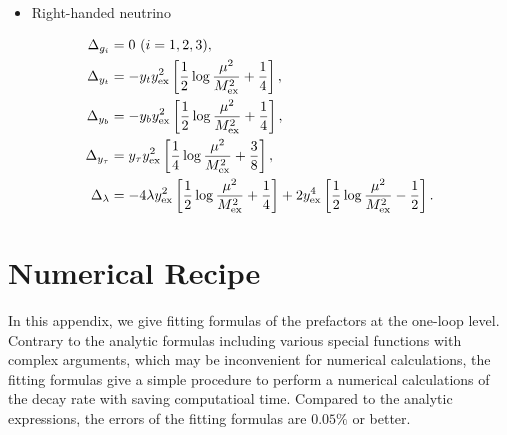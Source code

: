 \documentclass[12pt]{article}
\begin{document}
\begin{itemize}
 \item Right-handed neutrino
\end{itemize}
\begin{align}
 \Delta_{g_i} &= 0\ (i = 1,2,3),\\
 \Delta_{y_t} &= - y_t y_{\rm ex}^2 \left[ \frac{1}{2} \log
 \frac{\mu^2}{M_{\rm ex}^2} + \frac{1}{4} \right],\\
 \Delta_{y_b} &= - y_b y_{\rm ex}^2 \left[ \frac{1}{2} \log
 \frac{\mu^2}{M_{\rm ex}^2} + \frac{1}{4} \right],\\
 \Delta_{y_\tau} &= y_\tau y_{\rm ex}^2 \left[ \frac{1}{4} \log
 \frac{\mu^2}{M_{\rm ex}^2} + \frac{3}{8} \right],\\
 \Delta_{\lambda} &= - 4 \lambda y_{\rm ex}^2 \left[ \frac{1}{2} \log
 \frac{\mu^2}{M_{\rm ex}^2} + \frac{1}{4} \right] + 2 y_{\rm ex}^4 \left[
 \frac{1}{2} \log \frac{\mu^2}{M_{\rm ex}^2} - \frac{1}{2} \right].
\end{align}

\section{Numerical Recipe}
\label{apx_recipe}
\setcounter{equation}{0}

In this appendix, we give fitting formulas of the prefactors at the
one-loop level.  Contrary to the analytic formulas including various
special functions with complex arguments, which may be inconvenient
for numerical calculations, the fitting formulas give a simple
procedure to perform a numerical calculations of the decay rate with
saving computatioal time.  Compared to the analytic expressions, the
errors of the fitting formulas are $0.05\%$ or better.


\end{document}
